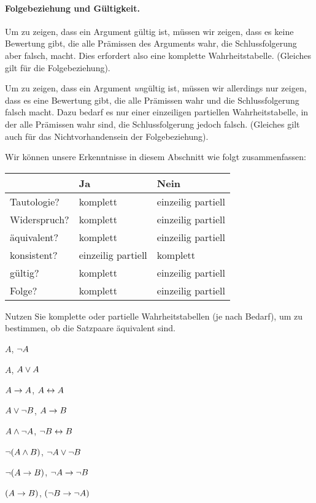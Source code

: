 \paragraph{Folgebeziehung und Gültigkeit.}
Um zu zeigen, dass ein Argument gültig ist, müssen wir zeigen, dass es keine Bewertung gibt, die alle Prämissen des Arguments wahr, die Schlussfolgerung aber falsch, macht. Dies erfordert also eine komplette Wahrheitstabelle. (Gleiches gilt für die Folgebeziehung).

Um zu zeigen, dass ein Argument \emph{un}gültig ist, müssen wir allerdings nur zeigen, dass es eine Bewertung gibt, die alle Prämissen wahr und die Schlussfolgerung falsch macht. Dazu bedarf es nur einer einzeiligen partiellen Wahrheitstabelle, in der alle Prämissen wahr sind, die Schlussfolgerung jedoch falsch. (Gleiches gilt auch für das Nichtvorhandensein der Folgebeziehung).

Wir können unsere Erkenntnisse in diesem Abschnitt wie folgt zusammenfassen:
\begin{center}
\begin{tabular}{l l l}
 & \textbf{Ja} & \textbf{Nein}\\
 \hline
Tautologie? & komplett & einzeilig partiell \\
Widerspruch? &  komplett & einzeilig partiell \\
äquivalent? & komplett  & einzeilig partiell \\
konsistent? & einzeilig partiell & komplett \\
gültig? & komplett & einzeilig partiell \\
Folge? & komplett & einzeilig partiell\\
\end{tabular}
\end{center}
\label{table.CompleteVsPartial}


\practiceproblems

\problempart
\label{pr.TT.equiv3}
Nutzen Sie komplette oder partielle Wahrheitstabellen (je nach Bedarf), um zu bestimmen, ob die Satzpaare äquivalent sind.
\begin{earg}
\item $A$, $\neg A$ %
\item $A$, $A \vee A$ %
\item $A\rightarrow A$, $A \leftrightarrow A$ %
\item $A \vee \neg B$, $A\rightarrow B$ %
\item $A \wedge \neg A$, $\neg B \leftrightarrow B$ %
\item $\neg(A \wedge B)$, $\neg A \vee \neg B$ %
\item $\neg(A \rightarrow B)$, $\neg A \rightarrow \neg B$ %
\item $(A \rightarrow B)$, $(\neg B \rightarrow \neg A)$ %
\end{earg}

